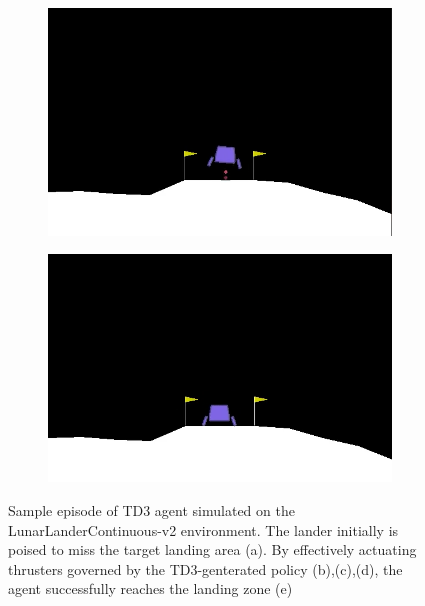 \documentclass{article}
\begin{document}
\begin{figure}[!p]
\begin{subfigure}{0.18\textwidth}
  \caption{}
  \end{subfigure}
  \begin{subfigure}{0.18\textwidth}
  \centering
  \includegraphics[width=\textwidth]{figures/lander/frame4}
  \caption{}
  \end{subfigure}
  \begin{subfigure}{0.18\textwidth}
  \centering
  \includegraphics[width=\textwidth]{figures/lander/frame5}
  \caption{}
  \end{subfigure}
  \caption{Sample episode of TD3 agent simulated on the LunarLanderContinuous-v2 environment. The lander initially is poised to miss the target landing area (a). By effectively actuating thrusters governed by the TD3-genterated policy (b),(c),(d), the agent successfully reaches the landing zone (e)}
  \label{fig:lander_episode}
\end{figure}
\end{document}
